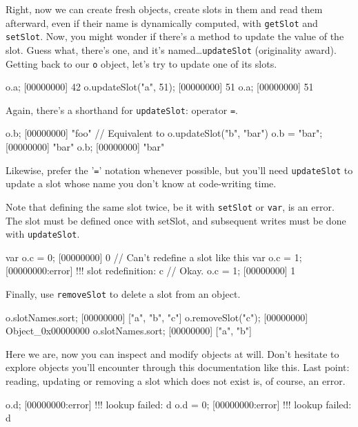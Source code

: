 Right, now we can create fresh objects, create slots in them and read
them afterward, even if their name is dynamically computed, with
\lstinline{getSlot} and \lstinline{setSlot}. Now, you might wonder if
there's a method to update the value of the slot. Guess what, there's
one, and it's named\ldots \lstinline{updateSlot} (originality
award). Getting back to our \lstinline{o} object, let's try to update one
of its slots.

\begin{urbiscript}
o.a;
[00000000] 42
o.updateSlot("a", 51);
[00000000] 51
o.a;
[00000000] 51
\end{urbiscript}

Again, there's a shorthand for \lstinline{updateSlot}: operator
\lstinline{=}.

\begin{urbiscript}
o.b;
[00000000] "foo"
// Equivalent to o.updateSlot("b", "bar")
o.b = "bar";
[00000000] "bar"
o.b;
[00000000] "bar"
\end{urbiscript}

Likewise, prefer the '\lstinline{=}' notation whenever
possible, but you'll need \lstinline{updateSlot} to update a slot whose
name you don't know at code-writing time.

Note that defining the same slot twice, be it with \lstinline{setSlot} or
\lstinline{var}, is an error. The slot must be defined once with setSlot,
and subsequent writes must be done with \lstinline{updateSlot}.

\begin{urbiscript}
var o.c = 0;
[00000000] 0
// Can't redefine a slot like this
var o.c = 1;
[00000000:error] !!! slot redefinition: c
// Okay.
o.c = 1;
[00000000] 1
\end{urbiscript}

Finally, use \lstinline{removeSlot} to delete a slot from an object.

\begin{urbiscript}
o.slotNames.sort;
[00000000] ["a", "b", "c"]
o.removeSlot("c");
[00000000] Object_0x00000000
o.slotNames.sort;
[00000000] ["a", "b"]
\end{urbiscript}

Here we are, now you can inspect and modify objects at will. Don't
hesitate to explore \us objects you'll encounter through this
documentation like this. Last point: reading, updating or removing a
slot which does not exist is, of course, an error.

\begin{urbiscript}
o.d;
[00000000:error] !!! lookup failed: d
o.d = 0;
[00000000:error] !!! lookup failed: d
\end{urbiscript}

